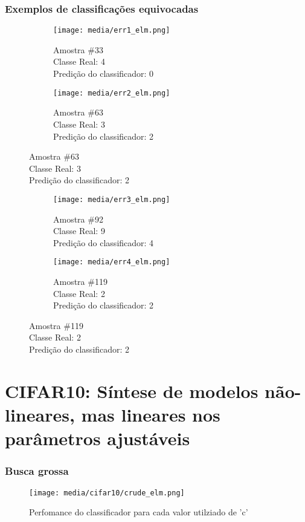 \documentclass[a4paper]{article}
\begin{document}
\subsubsection{Exemplos de classificações equivocadas}

\begin{figure}[H]
    \centering
    \begin{subfigure}{.5\textwidth}
        \centerline{\texttt{[image: media/err1\_elm.png]}}
        \caption{Amostra \#33  \\ Classe Real: 4 \\ Predição do classificador: 0}
        \label{fig:fig20}
    \end{subfigure}%
    \begin{subfigure}{.5\textwidth}
        \centerline{\texttt{[image: media/err2\_elm.png]}}
        \caption{Amostra \#63  \\ Classe Real: 3 \\ Predição do classificador: 2}
        \label{fig:fig21}
    \end{subfigure}%
\end{figure}
\begin{figure}[H]
    \centering
    \begin{subfigure}{.5\textwidth}
        \centerline{\texttt{[image: media/err3\_elm.png]}}
        \caption{Amostra \#92  \\ Classe Real: 9 \\ Predição do classificador: 4}
        \label{fig:fig22}
    \end{subfigure}%
    \begin{subfigure}{.5\textwidth}
        \centerline{\texttt{[image: media/err4\_elm.png]}}
        \caption{Amostra \#119  \\ Classe Real: 2 \\ Predição do classificador: 2}
        \label{fig:fig23}
    \end{subfigure}%
\end{figure}



\section{CIFAR10: Síntese de modelos não-lineares, mas lineares nos parâmetros ajustáveis}


\subsubsection{Busca grossa}
\begin{figure}[H]
    \centering   %
    \centerline{\texttt{[image: media/cifar10/crude\_elm.png]}}
    \caption{Perfomance do classificador para cada valor utilziado de 'c'}  %
    \label{fig:fig1}  %
\end{figure}
\end{document}
